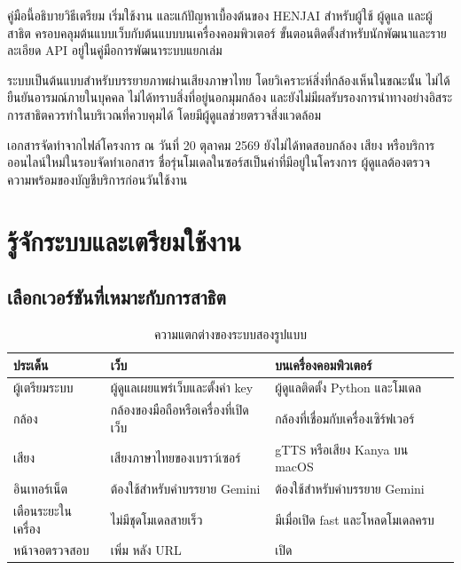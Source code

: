 

คู่มือนี้อธิบายวิธีเตรียม เริ่มใช้งาน และแก้ปัญหาเบื้องต้นของ HENJAI สำหรับผู้ใช้ ผู้ดูแล และผู้สาธิต ครอบคลุมต้นแบบเว็บกับต้นแบบบนเครื่องคอมพิวเตอร์ ขั้นตอนติดตั้งสำหรับนักพัฒนาและรายละเอียด API อยู่ในคู่มือการพัฒนาระบบแยกเล่ม

ระบบเป็นต้นแบบสำหรับบรรยายภาพผ่านเสียงภาษาไทย โดยวิเคราะห์สิ่งที่กล้องเห็นในขณะนั้น ไม่ได้ยืนยันอารมณ์ภายในบุคคล ไม่ได้ทราบสิ่งที่อยู่นอกมุมกล้อง และยังไม่มีผลรับรองการนำทางอย่างอิสระ การสาธิตควรทำในบริเวณที่ควบคุมได้ โดยมีผู้ดูแลช่วยตรวจสิ่งแวดล้อม

เอกสารจัดทำจากไฟล์โครงการ ณ วันที่ 20 ตุลาคม 2569 ยังไม่ได้ทดสอบกล้อง เสียง หรือบริการออนไลน์ใหม่ในรอบจัดทำเอกสาร ชื่อรุ่นโมเดลในซอร์สเป็นค่าที่มีอยู่ในโครงการ ผู้ดูแลต้องตรวจความพร้อมของบัญชีบริการก่อนวันใช้งาน

\tableofcontents
\clearpage{}
\chapter{รู้จักระบบและเตรียมใช้งาน}
\section{เลือกเวอร์ชันที่เหมาะกับการสาธิต}
\begin{table}[H]\centering\caption{ความแตกต่างของระบบสองรูปแบบ}
\begin{tabularx}{\linewidth}{lYY}\toprule ประเด็น & เว็บ & บนเครื่องคอมพิวเตอร์\\\midrule
ผู้เตรียมระบบ & ผู้ดูแลเผยแพร่เว็บและตั้งค่า key & ผู้ดูแลติดตั้ง Python และโมเดล\\
กล้อง & กล้องของมือถือหรือเครื่องที่เปิดเว็บ & กล้องที่เชื่อมกับเครื่องเซิร์ฟเวอร์\\
เสียง & เสียงภาษาไทยของเบราว์เซอร์ & gTTS หรือเสียง Kanya บน macOS\\
อินเทอร์เน็ต & ต้องใช้สำหรับคำบรรยาย Gemini & ต้องใช้สำหรับคำบรรยาย Gemini\\
เตือนระยะในเครื่อง & ไม่มีชุดโมเดลสายเร็ว & มีเมื่อเปิด fast และโหลดโมเดลครบ\\
หน้าจอตรวจสอบ & เพิ่ม  หลัง URL & เปิด \\\bottomrule
\end{tabularx}\end{table}

